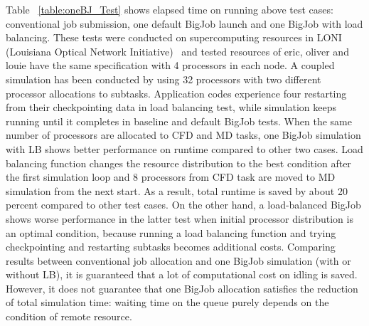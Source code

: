 \documentclass[conference,final]{IEEEtran}
\begin{document}
Table ~\ref{table:oneBJ_Test} shows elapsed time on running above test cases: conventional job submission, one default BigJob launch and one BigJob with load balancing. These tests were conducted on supercomputing resources in LONI (Louisiana Optical Network Initiative)~\cite{LONI_web} and tested resources of eric, oliver and louie have the same specification with 4 processors in each node. A coupled simulation has been conducted by using 32 processors with two different processor allocations to subtasks. Application codes experience four restarting from their checkpointing data in load balancing test, while simulation keeps running until it completes in baseline and default BigJob tests.
When the same number of processors are allocated to CFD and MD tasks, one BigJob simulation with LB shows better performance on runtime compared to other two cases. Load balancing function changes the resource distribution to the best condition after the first simulation loop and 8 processors from CFD task are moved to MD simulation from the next start. As a result, total runtime is saved by about 20 percent compared to other test cases. On the other hand, a load-balanced BigJob shows worse performance in the latter test when initial processor distribution is an optimal condition, because running a load balancing function and trying checkpointing and restarting subtasks becomes additional costs. Comparing results between conventional job allocation and one BigJob simulation (with or without LB), it is guaranteed that a lot of computational cost on idling is saved. However, it does not guarantee that one BigJob allocation satisfies the reduction of total simulation time: waiting time on the queue purely depends on the condition of remote resource.


\end{document}
